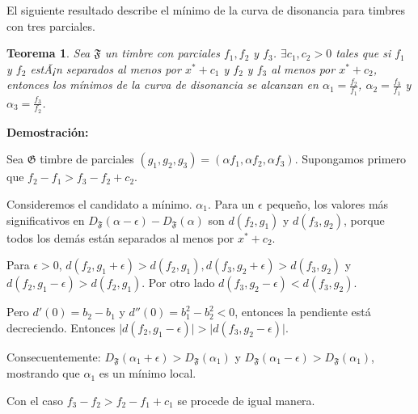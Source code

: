 \documentclass[11pt,a4paper]{article}
\newtheorem{teor}{Teorema}
\begin{document}

El siguiente resultado describe el mínimo de la curva de disonancia para timbres con tres parciales.


	\begin{teor}                      %
	Sea $\mathfrak{F}$ un timbre con parciales $f_1, f_2$ y $f_3$. $\exists c_1, c_2 > 0$  tales que si $f_1$ y $f_2$ estÃ¡n separados al menos por $x^{*} + c_1$ y $f_2$ y $f_3$ al menos por $x^{*} + c_2$, entonces los mínimos de la curva de disonancia se alcanzan en $\alpha_1 = \frac{f_2}{f_1}$, $\alpha_2 = \frac{f_3}{f_1}$ y $\alpha_3 = \frac{f_3}{f_2}$.
	\end{teor}

\noindent\textbf{Demostración:} 

Sea $\mathfrak{G}$ timbre de parciales $(g_1, g_2, g_3) = (\alpha f_1, \alpha f_2, \alpha f_3)$. Supongamos primero que $f_2 - f_1 > f_3 - f_2 + c_2$.

Consideremos el candidato a mínimo. $\alpha_1$. Para un $\epsilon$ pequeño, los valores más significativos en $D_{\mathfrak{F}}(\alpha - \epsilon) - D_{\mathfrak{F}}(\alpha)$ son $d(f_2, g_1)$ y $d(f_3, g_2)$, porque todos los demás están separados al menos por $x^{*} + c_2$.

Para $\epsilon > 0$, $d(f_2, g_1 + \epsilon) > d(f_2, g_1), d(f_3, g_2 + \epsilon) > d(f_3, g_2)$ y $d(f_2, g_1 - \epsilon) > d(f_2, g_1)$. Por otro lado $d(f_3, g_2 - \epsilon) <  d(f_3,g_2)$.

Pero $d'(0) = b_2 - b_1$ y $d''(0) = b_1^2 - b_2^2  < 0 $, entonces la pendiente está decreciendo. Entonces $ \vert d(f_2, g_1 - \epsilon) \vert > \vert d(f_3, g_2 - \epsilon) \vert$.

Consecuentemente: $D_{\mathfrak{F}} (\alpha_1 + \epsilon) > D_{\mathfrak{F}} (\alpha_1) $ y $ D_{\mathfrak{F}} (\alpha_1 - \epsilon) > D_{\mathfrak{F}} (\alpha_1) $, mostrando que $\alpha_1$ es un mínimo local.
 
Con el caso $f_3 - f_2 > f_2 - f_1 + c_1$ se procede de igual manera.
\end{document}
